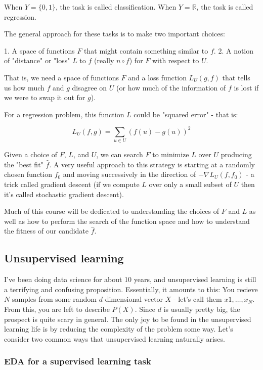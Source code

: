 \documentclass{article}
\begin{document}
When $Y = \{0, 1\}$, the task is called classification. When $Y = \mathbb{R}$, the task is called regression.

The general approach for these tasks is to make two important choices:

1. A space of functions $F$ that might contain something similar to $f$.
2. A notion of "distance" or "loss" $L$ to $f$ (really $n \circ f$) for $F$ with respect to $U$.

That is, we need a space of functions $F$ and a loss function $L_U(g, f)$ that tells us how much $f$ and $g$ disagree on $U$ (or how much of the information of $f$ is lost if we were to swap it out for $g$).

For a regression problem, this function $L$ could be "squared error" - that is:

$$L_U(f, g) = \sum_{u \in U} (f(u) - g(u))^2 $$

Given a choice of $F$, $L$, and $U$, we can search $F$ to minimize $L$ over $U$ producing the "best fit" $\hat{f}$. A very useful approach to this strategy is starting at a randomly chosen function $f_0$ and moving successively in the direction of $-\nabla L_U(f, f_0)$ - a trick called gradient descent (if we compute $L$ over only a small subset of $U$ then it's called stochastic gradient descent).

Much of this course will be dedicated to understanding the choices of $F$ and $L$ as well as how to perform the search of the function space and how to understand the fitness of our candidate $\hat{f}$.

\subsection{Unsupervised learning}

I've been doing data science for about 10 years, and unsupervised learning is still a terrifying and confusing proposition. Essentially, it amounts to this: You recieve $N$ samples from some random $d$-dimensional vector $X$ - let's call them $x1, \dots , x_N$. From this, you are left to describe $P(X)$. Since $d$ is usually pretty big, the prospect is quite scary in general. The only joy to be found in the unsupervised learning life is by reducing the complexity of the problem some way. Let's consider two common ways that unsupervised learning naturally arises.

\subsubsection{EDA for a supervised learning task}
\end{document}
